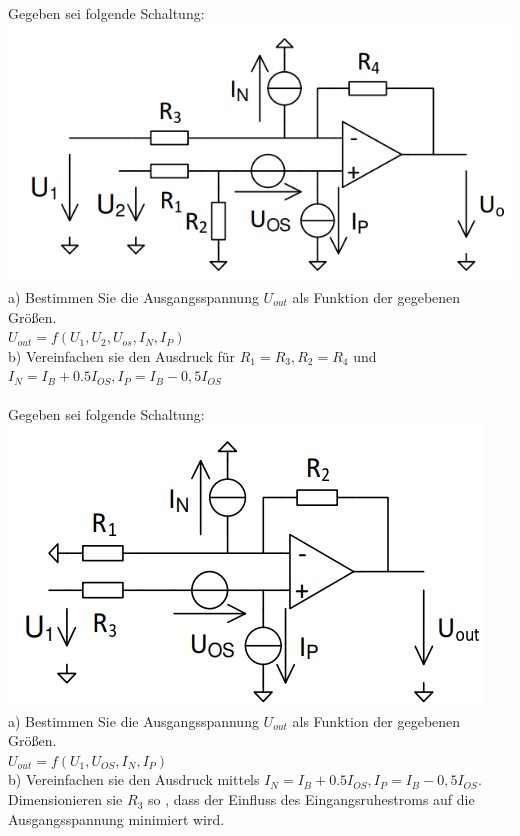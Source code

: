 \documentclass[A4]{scrartcl}
\begin{document}
  Gegeben sei folgende Schaltung:\\
  \includegraphics{Schaltung1.png}\\
  a) Bestimmen Sie die Ausgangsspannung $U_{out}$ als Funktion der gegebenen Größen.\\
  $U_{out} = f(U_1,U_2,U_{os},I_N,I_P)$\\
  b) Vereinfachen sie den Ausdruck für $R_1 = R_3, R_2 = R_4$ und $I_N = I_B + 0.5 I_{OS}, I_P = I_B-0,5I_{OS}$\\\\

  Gegeben sei folgende Schaltung:\\
  \includegraphics{Schaltung8.png}\\
  a) Bestimmen Sie die Ausgangsspannung $U_{out}$ als Funktion der gegebenen Größen.\\
  $U_{out} = f(U_1,U_{OS},I_N,I_P)$\\
  b) Vereinfachen sie den Ausdruck mittels $I_N = I_B + 0.5 I_{OS}, I_P = I_B-0,5 I_{OS}$.\\
  Dimensionieren sie $R_3$ so , dass der Einfluss des Eingangsruhestroms auf die Ausgangsspannung minimiert wird.\\\\
\end{document}
